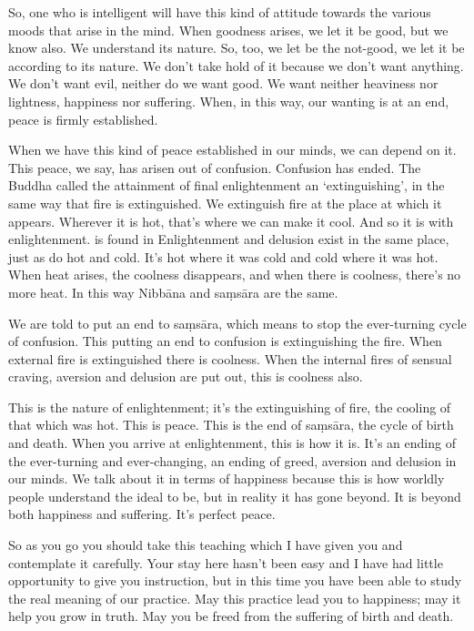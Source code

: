So, one who is intelligent will have this kind of attitude towards the various moods that arise in the mind. When goodness arises, we let it be good, but we know also. We understand its nature. So, too, we let be the not-good, we let it be according to its nature. We don't take hold of it because we don't want anything. We don't want evil, neither do we want good. We want neither heaviness nor lightness, happiness nor suffering. When, in this way, our wanting is at an end, peace is firmly established. 

When we have this kind of peace established in our minds, we can depend on it. This peace, we say, has arisen out of confusion. Confusion has ended. The Buddha called the attainment of final enlightenment an `extinguishing', in the same way that fire is extinguished. We extinguish fire at the place at which it appears. Wherever it is hot, that's where we can make it cool. And so it is with enlightenment.  is found in  Enlightenment and delusion exist in the same place, just as do hot and cold. It's hot where it was cold and cold where it was hot. When heat arises, the coolness disappears, and when there is coolness, there's no more heat. In this way Nibb\=ana and sa\d{m}s\=ara are the same.

We are told to put an end to sa\d{m}s\=ara, which means to stop the ever-turning cycle of confusion. This putting an end to confusion is extinguishing the fire. When external fire is extinguished there is coolness. When the internal fires of sensual craving, aversion and delusion are put out, this is coolness also.

This is the nature of enlightenment; it's the extinguishing of fire, the cooling of that which was hot. This is peace. This is the end of sa\d{m}s\=ara, the cycle of birth and death. When you arrive at enlightenment, this is how it is. It's an ending of the ever-turning and ever-changing, an ending of greed, aversion and delusion in our minds. We talk about it in terms of happiness because this is how worldly people understand the ideal to be, but in reality it has gone beyond. It is beyond both happiness and suffering. It's perfect peace.

So as you go you should take this teaching which I have given you and contemplate it carefully. Your stay here hasn't been easy and I have had little opportunity to give you instruction, but in this time you have been able to study the real meaning of our practice. May this practice lead you to happiness; may it help you grow in truth. May you be freed from the suffering of birth and death.  
